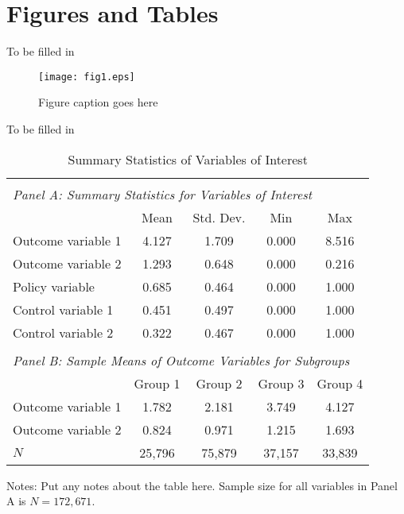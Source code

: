 \documentclass[12pt,english]{article}
\begin{document}
\vfill
\pagebreak{}
\clearpage

\section*{Figures and Tables}\label{sec:figTables}
To be filled in
\begin{figure}[ht]
\centering
\bigskip{}
\texttt{[image: fig1.eps]}
\caption{Figure caption goes here}
\label{fig:fig1}
\end{figure}

To be filled in
\begin{table}[ht]
\caption{Summary Statistics of Variables of Interest}
\label{tab:descriptives} 
\centering
\begin{threeparttable}
\begin{tabular}{lcccc}
&&&&\\
\multicolumn{5}{l}{\emph{Panel A: Summary Statistics for Variables of Interest}}\\
\toprule
                                                        & Mean  & Std. Dev. & Min   & Max   \\
\midrule
Outcome variable 1                                      & 4.127 & 1.709     & 0.000 & 8.516 \\
Outcome variable 2                                      & 1.293 & 0.648     & 0.000 & 0.216 \\
Policy variable                                         & 0.685 & 0.464     & 0.000 & 1.000 \\
Control variable 1                                      & 0.451 & 0.497     & 0.000 & 1.000 \\
Control variable 2                                      & 0.322 & 0.467     & 0.000 & 1.000 \\
&&&&\\
\multicolumn{5}{l}{\emph{Panel B: Sample Means of Outcome Variables for Subgroups}}\\
\midrule
                                                        & Group 1 & Group 2 & Group 3 & Group 4 \\
\midrule
Outcome variable 1                                      & 1.782  & 2.181  & 3.749  & 4.127  \\
Outcome variable 2                                      & 0.824  & 0.971  & 1.215  & 1.693  \\
\midrule
$N$                                                     & 25,796 & 75,879 & 37,157 & 33,839 \\
\bottomrule
\end{tabular}
\footnotesize Notes: Put any notes about the table here. Sample size for all variables in Panel A is $N=172,671$.
\end{threeparttable}
\end{table}
\end{document}
